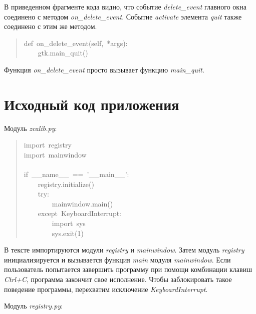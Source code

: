 \documentclass[a4paper,openany,twoside,final]{book}
\providecommand*{\DUroletitlereference}[1]{\textsl{#1}}
\begin{document}
В приведенном фрагменте кода видно, что событие \DUroletitlereference{delete\_event}
главного окна соединено с методом \DUroletitlereference{on\_delete\_event}.  Событие
\DUroletitlereference{activate} элемента \DUroletitlereference{quit} также соединено с этим же методом.

\begin{quote}{\ttfamily \raggedright \noindent
def~on\_delete\_event(self,~*args):\\
~~~~gtk.main\_quit()
}
\end{quote}

Функция \DUroletitlereference{on\_delete\_event} просто вызывает функцию \DUroletitlereference{main\_quit}.


\section{Исходный код приложения%
  \label{id52}%
}

Модуль \DUroletitlereference{zcalib.py}:

\begin{quote}{\ttfamily \raggedright \noindent
import~registry\\
import~mainwindow\\
~\\
if~\_\_name\_\_~==~'\_\_main\_\_':\\
~~~~registry.initialize()\\
~~~~try:\\
~~~~~~~~mainwindow.main()\\
~~~~except~KeyboardInterrupt:\\
~~~~~~~~import~sys\\
~~~~~~~~sys.exit(1)
}
\end{quote}

В тексте импортируются модули \DUroletitlereference{registry} и \DUroletitlereference{mainwindow}.  Затем модуль
\DUroletitlereference{registry} инициализируется и вызывается функция \DUroletitlereference{main} модуля
\DUroletitlereference{mainwindow}.  Если пользователь попытается завершить программу при
помощи комбинации клавиш \DUroletitlereference{Ctrl+C}, программа закончит свое исполнение.
Чтобы заблокировать такое поведение программы, перехватим исключение
\DUroletitlereference{KeyboardInterrupt}.

Модуль \DUroletitlereference{registry.py}:
\end{document}
